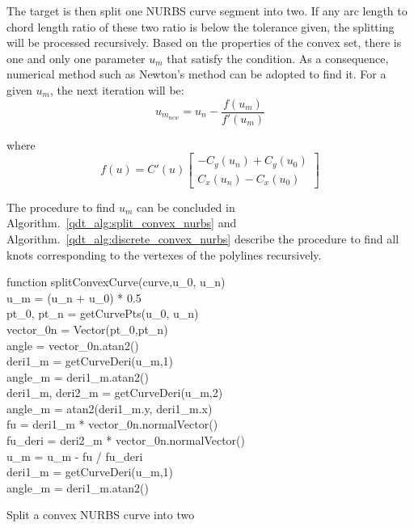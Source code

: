 The target is then split one NURBS curve segment into two.
If any arc length to chord length ratio of these two ratio is below the tolerance given, the splitting will be processed recursively.
Based on the properties of the convex set, there is one and only one parameter $u_m$ that satisfy the condition.
As a consequence, numerical method such as Newton's method can be adopted to find it.
For a given $u_m$, the next iteration will be:
    \begin{equation}
        u_{m_{new}} =  u_n - \frac{f(u_m)}{f'(u_m)}
    \end{equation}

where 
    \begin{equation}
        f(u) = C'(u) \begin{bmatrix}
            - C_y(u_n) + C_y(u_0) \\
            C_x(u_n) - C_x(u_0)
        \end{bmatrix}
    \end{equation}

The procedure to find $u_m$ can be concluded in Algorithm.~\ref{qdt_alg:split_convex_nurbs} and Algorithm.~\ref{qdt_alg:discrete_convex_nurbs} describe the procedure to find all knots corresponding to the vertexes of the polylines recursively.
\begin{algorithm}
    function splitConvexCurve(curve,u\_0, u\_n) \\
    u\_m = (u\_n + u\_0) * 0.5 \\
    pt\_0, pt\_n = getCurvePts(u\_0, u\_n) \\
    vector\_0n = Vector(pt\_0,pt\_n) \\
    angle = vector\_0n.atan2() \\
    deri1\_m = getCurveDeri(u\_m,1) \\
    angle\_m = deri1\_m.atan2() \\
      {
        deri1\_m, deri2\_m = getCurveDeri(u\_m,2) \\
        angle\_m = atan2(deri1\_m.y, deri1\_m.x)  \\
        fu = deri1\_m * vector\_0n.normalVector() \\
        fu\_deri = deri2\_m * vector\_0n.normalVector() \\
        u\_m = u\_m - fu / fu\_deri \\
        deri1\_m = getCurveDeri(u\_m,1) \\
        angle\_m = deri1\_m.atan2()
      }
    \caption{Split a convex NURBS curve into two}
    \label{qdt_alg:split_convex_nurbs}
\end{algorithm}


